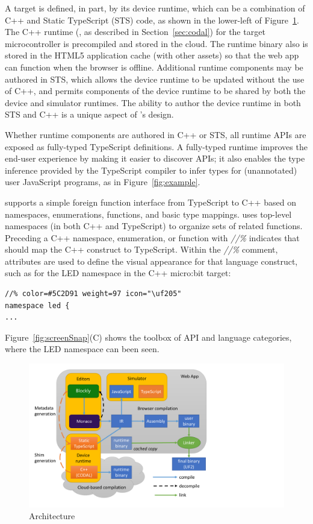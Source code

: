 A \MC target is defined, in part, by its device runtime, which can be a combination of C++ 
and Static TypeScript (STS) code, as shown in the lower-left of Figure~\ref{fig:makecode}.
The C++ runtime (\CO, as described in Section~\ref{sec:codal}) for the target microcontroller is precompiled 
and stored in the cloud. The runtime binary also is stored in the HTML5 application cache (with 
other assets) so that the web app can function when the browser is offline. Additional runtime
components may be authored in STS, which allows the device runtime to be updated without the
use of C++, and permits components of the device runtime to be shared by both the device
and simulator runtimes. The ability to author the device runtime in both STS and C++ is
a unique aspect of \MC's design.

Whether runtime components are authored in C++ or STS, all runtime APIs are exposed as fully-typed
TypeScript definitions. A fully-typed runtime improves the end-user experience 
by making it easier to discover APIs; it also enables the type inference provided by the TypeScript 
compiler to infer types for (unannotated) user JavaScript programs, as in Figure~\ref{fig:example}.

\MC supports a simple foreign function interface from TypeScript to C++ based on namespaces,
enumerations, functions, and basic type mappings. \MC uses top-level namespaces (in both C++ and
TypeScript) to organize sets of related functions.  Preceding a C++ namespace, enumeration, or function
with \emph{//\%} indicates that \MC should map the C++ construct to TypeScript.
Within the \emph{//\%} comment, attributes are used to define the visual appearance for that
language construct, such as for the LED namespace in the C++ micro:bit target:

\begin{lstlisting}
//% color=#5C2D91 weight=97 icon="\uf205"
namespace led { 
...
\end{lstlisting}

Figure~\ref{fig:screenSnap}(C) shows the toolbox of API and language categories, where the LED
namespace can been seen. 

\begin{figure}[t]
    \includegraphics[width=4.5in]{makecodeFig.pdf}
\caption{\label{fig:makecode}\MC Architecture}
\end{figure}

